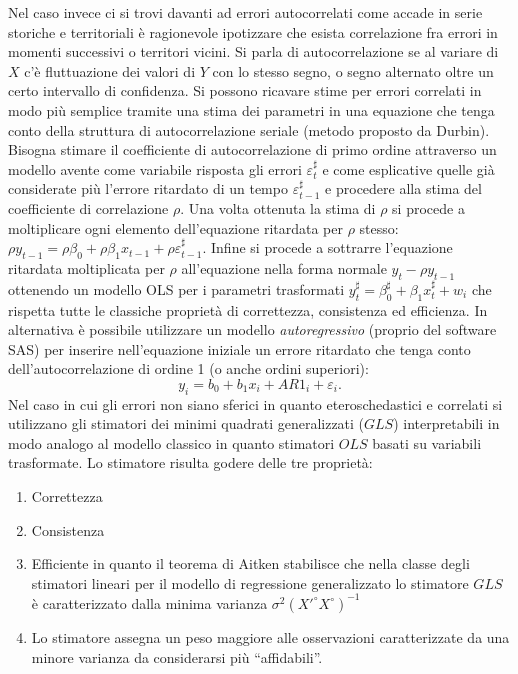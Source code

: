 \documentclass[a4page, 11pt]{article}
\begin{document}
Nel caso invece ci si trovi davanti ad errori autocorrelati come accade in serie storiche e territoriali è ragionevole ipotizzare che esista correlazione fra errori in momenti successivi o territori vicini. Si parla di autocorrelazione se al variare di $X$ c'è fluttuazione dei valori di $Y$ con lo stesso segno, o segno alternato oltre un certo intervallo di confidenza. Si possono ricavare stime per errori correlati in modo più semplice tramite una stima dei parametri in una equazione che tenga conto della struttura di autocorrelazione seriale (metodo proposto da Durbin). Bisogna stimare il coefficiente di autocorrelazione di primo ordine attraverso un modello avente come variabile risposta gli errori $\varepsilon_t^\sharp$ e come esplicative quelle già considerate più l’errore ritardato di un tempo $\varepsilon_{t-1}^\sharp$ e procedere alla stima del coefficiente di correlazione $\rho$. Una volta ottenuta la stima di $\rho$ si procede a moltiplicare ogni elemento dell'equazione ritardata per $\rho$ stesso: $\rho y_{t-1} = \rho\beta_0 + \rho\beta_1 x_{t-1} +\rho\varepsilon_{t-1}^\sharp$. Infine si procede a sottrarre l'equazione ritardata moltiplicata per $\rho$ all'equazione nella forma normale $y_t - \rho y_{t-1}$ ottenendo un modello OLS per i parametri trasformati $y_t^\sharp = \beta_0^\sharp + \beta_1 x_t^\sharp + w_i$ che rispetta tutte le classiche proprietà di correttezza, consistenza ed efficienza. In alternativa è possibile utilizzare un modello \textit{autoregressivo} (proprio del software SAS) per inserire nell’equazione iniziale un errore ritardato che tenga conto dell’autocorrelazione di ordine 1 (o anche ordini superiori): 
\begin{equation*}
y_i=b_0 +b_1 x_i +AR1_i  + \varepsilon_i. 
\end{equation*}
Nel caso in cui gli errori non siano sferici in quanto eteroschedastici e correlati si utilizzano gli stimatori dei minimi quadrati generalizzati ($GLS$) interpretabili in modo analogo al modello classico in quanto stimatori $OLS$ basati su variabili trasformate. Lo stimatore risulta godere delle tre proprietà:
\begin{enumerate}[noitemsep]
\item Correttezza
\item Consistenza
\item Efficiente in quanto il teorema di Aitken stabilisce che nella classe degli stimatori lineari per il modello di regressione generalizzato lo stimatore $GLS$ è caratterizzato dalla minima varianza $\sigma^2 (X'^{\circ}X^{\circ})^{-1}$
\item Lo stimatore assegna un peso maggiore alle osservazioni caratterizzate da una minore varianza da considerarsi più ``affidabili''.
\end{enumerate}
\end{document}
